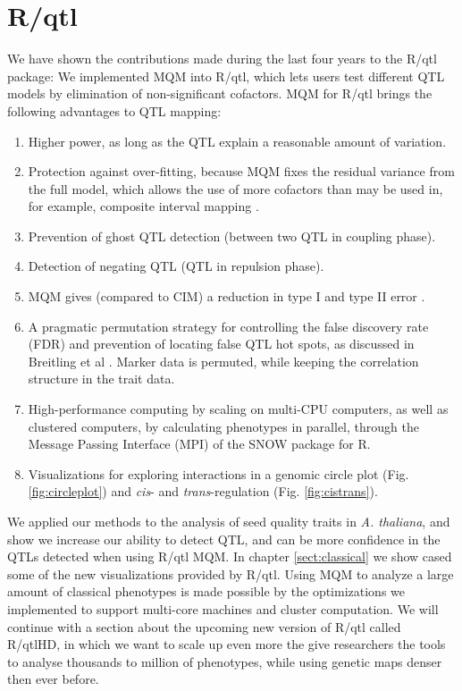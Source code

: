 \section{R/qtl}
\label{sect:qtl}
We have shown the contributions made during the last four years to the R/qtl package:
We implemented MQM into R/qtl, which lets users test different QTL models by elimination 
of non-significant cofactors. MQM for R/qtl brings the following advantages to QTL mapping:
\begin{enumerate}\itemsep1pt
\item Higher power, as long as the QTL explain a reasonable amount of variation.
\item Protection against over-fitting, because MQM fixes the residual variance from the full 
model, which allows the use of more cofactors than may be used in, for example, composite 
interval mapping \cite{Zeng:1994}.
\item Prevention of ghost QTL detection (between two QTL in coupling phase).
\item Detection of negating QTL (QTL in repulsion phase). 
\item MQM gives (compared to CIM) a reduction in type I and type II error \cite{Handbook:Jansen:2007}.
\item A pragmatic permutation strategy for controlling the false discovery rate (FDR) and 
prevention of locating false QTL hot spots, as discussed in Breitling et al \cite{Breitling:2008a}. 
Marker data is permuted, while keeping the correlation structure in the trait data.
\item High-performance computing by scaling on multi-CPU computers, as well as clustered 
computers, by calculating phenotypes in parallel, through the Message Passing Interface (MPI) of 
the SNOW package for R\cite{Tierney:2009}.
\item Visualizations for exploring interactions in a genomic circle plot (Fig. \ref{fig:circleplot}) and \emph{cis}- 
and \emph{trans}-regulation (Fig. \ref{fig:cistrans}).
\end{enumerate}
We applied our methods to the analysis of seed quality traits in \emph{A. thaliana}, and show we 
increase our ability to detect QTL, and can be more confidence in the QTLs detected when using R/qtl MQM.
In chapter \ref{sect:classical} we show cased some of the new visualizations provided by R/qtl. Using 
MQM to analyze a large amount of classical phenotypes is made possible by the optimizations we implemented 
to support multi-core machines and cluster computation. We will continue with a section about the upcoming 
new version of R/qtl called R/qtlHD, in which we want to scale up even more the give researchers the tools 
to analyse thousands to million of phenotypes, while using genetic maps denser then ever before.

